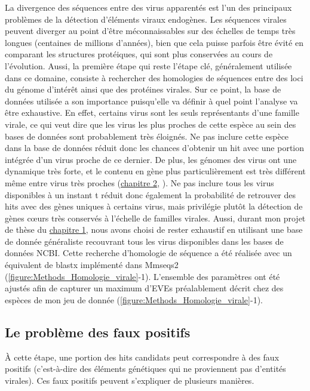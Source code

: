 La divergence des séquences entre des virus apparentés est l'un des principaux problèmes de la détection d'éléments viraux endogènes. Les séquences virales peuvent diverger au point d'être méconnaissables sur des échelles de temps très longues (centaines de millions d'années), bien que cela puisse parfois être évité en comparant les structures protéiques, qui sont plus conservées au cours de l'évolution. Aussi, la première étape qui reste l'étape clé, généralement utilisée dans ce domaine, consiste à rechercher des homologies de séquences entre des loci du génome d'intérêt ainsi que des protéines virales. Sur ce point, la base de données utilisée a son importance puisqu'elle va définir à quel point l'analyse va être exhaustive. En effet, certains virus sont les seuls représentants d'une famille virale, ce qui veut dire que les virus les plus proches de cette espèce au sein des bases de données sont probablement très éloignés. Ne pas inclure cette espèce dans la base de données réduit donc les chances d'obtenir un hit avec une portion intégrée d'un virus proche de ce dernier. De plus, les génomes des virus ont une dynamique très forte, et le contenu en gène plus particulièrement est très différent même entre virus très proches (\hyperref[sec:chap2]{chapitre 2}, \citep{koonin_no_2006,sun_unraveling_2021}). Ne pas inclure tous les virus disponibles à un instant t réduit donc également la probabilité de retrouver des hits avec des gènes uniques à certains virus, mais privilégie plutôt la détection de gènes cœurs très conservés à l'échelle de familles virales. Aussi, durant mon projet de thèse du \hyperref[sec:chap1]{chapitre 1}, nous avons choisi de rester exhaustif en utilisant une base de donnée généraliste recouvrant tous les virus disponibles dans les bases de données NCBI. Cette recherche d'homologie de séquence a été réalisée avec un équivalent de blastx implémenté dans Mmseqs2 \cite{steinegger_mmseqs2_2017} (\figurename{\ref{figure:Methods_Homologie_virale}}-1). L'ensemble des paramètres ont été ajustés afin de capturer un maximum d'EVEs préalablement décrit chez des espèces de mon jeu de donnée (\figurename{\ref{figure:Methods_Homologie_virale}}-1). \\

\subsection{Le problème des faux positifs}

À cette étape, une portion des hits candidats peut correspondre à des faux positifs (c'est-à-dire des éléments génétiques qui ne proviennent pas d'entités virales). Ces faux positifs peuvent s'expliquer de plusieurs manières.\\

